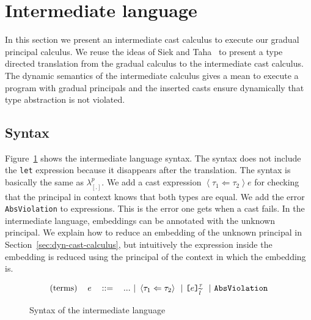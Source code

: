 \documentclass{article}
\newcommand{\emb}[3]{\texttt{[}#1\texttt{]}_{#2}^{#3}}
\newcommand{\cast}[2]{\left\langle #1 \Leftarrow #2 \right\rangle}
\newcommand\icode[1]{\texttt{#1}}
\newcommand\newcalculus[0]{$\lambda^p_{\left[.\right]}$}
\newcommand\wt[1]{\widetilde{#1}}
\begin{document}
\section{Intermediate language}\label{sec:intermediate_language}
In this section we present an intermediate cast calculus to execute our gradual principal calculus. We reuse the ideas of Siek and Taha~\cite{siekTaha:sfp2006} to present a type directed translation from the gradual calculus to the intermediate cast calculus. The dynamic semantics of the intermediate calculus gives a mean to execute a program with gradual principals and the inserted casts ensure dynamically that type abstraction is not violated.
\subsection{Syntax}
Figure~\ref{fig:syntax_intermediate-language} shows the intermediate language syntax. The syntax does not include the \icode{let} expression because it disappears after the translation. The syntax is basically the same as \newcalculus{}. We add a cast expression $\cast{\tau_1}{\tau_2}e$ for checking that the principal in context knows that both types are equal. We add the error \texttt{AbsViolation} to expressions. This is the error one gets when a cast fails. In the intermediate language, embeddings can be annotated with the unknown principal. We explain how to reduce an embedding of the unknown principal in Section~\ref{sec:dyn-cast-calculus}, but intuitively the expression inside the embedding is reduced using the principal of the context in which the embedding is.
\begin{figure}[!htbp]
	\[	
	\begin{tabular}{ l c l l}	
		(terms) & $e$ & $::=$ & $ ...~|~ \cast{\tau_1}{\tau_2}$ $~|~\emb{e}{\wt{l}}{\tau}$  $~|~\texttt{AbsViolation}$	\\	
	\end{tabular}
	\]
		\caption{Syntax of the intermediate language}
		\label{fig:syntax_intermediate-language}
	\end{figure}
	
\end{document}
